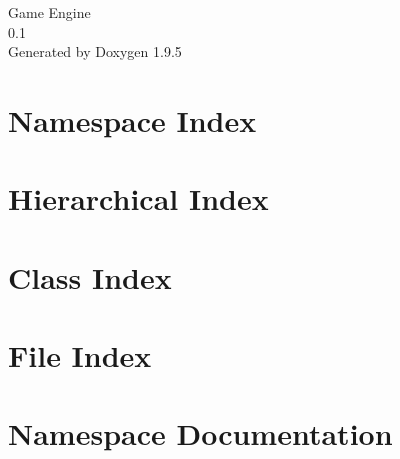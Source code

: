 \documentclass[twoside]{book}
\newcommand{\+}{\discretionary{\mbox{\scriptsize$\hookleftarrow$}}{}{}}
\newcommand{\clearemptydoublepage}{%
    \newpage{\pagestyle{empty}\cleardoublepage}%
  }
\begin{document}
  \raggedbottom
    \hypersetup{pageanchor=false,
                bookmarksnumbered=true,
                pdfencoding=unicode
               }
  \begin{titlepage}
  \vspace*{7cm}
  \begin{center}%
  {\Large Game Engine}\\
  [1ex]\large 0.\+1 \\
  \vspace*{1cm}
  {\large Generated by Doxygen 1.9.5}\\
  \end{center}
  \end{titlepage}
  \clearemptydoublepage
  \tableofcontents
  \clearemptydoublepage
  \hypersetup{pageanchor=true}
\chapter{Namespace Index}

\chapter{Hierarchical Index}

\chapter{Class Index}

\chapter{File Index}

\chapter{Namespace Documentation}













\end{document}
